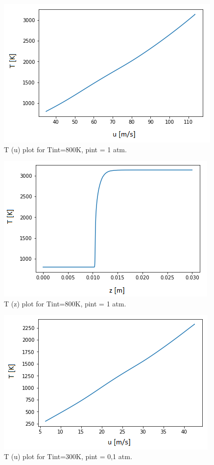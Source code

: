 \documentclass[11pt]{article}
\begin{document}
\begin{figure} [H]
	\begin{center}
\includegraphics[height=0.5\textwidth]{P3}
        \caption{T (u) plot for Tint=800K, pint = 1 atm.}
    \end{center}
\end{figure}

\begin{figure} [H]
	\begin{center}
\includegraphics[height=0.5\textwidth]{P4}
        \caption{T (z) plot for Tint=800K, pint = 1 atm.}
    \end{center}
\end{figure}

\begin{figure} [H]
	\begin{center}
\includegraphics[height=0.5\textwidth]{P5}
        \caption{T (u) plot for Tint=300K, pint = 0,1 atm.}
    \end{center}
\end{figure}
\end{document}
